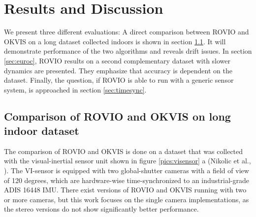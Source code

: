 \chapter{Results and Discussion}
\label{sec:results}

We present three different evaluations: A direct comparison between ROVIO and OKVIS on a long dataset collected indoors is shown in section \ref{sec:ijrr}. It will demonstrate performance of the two algorithms and reveals drift issues. In section \ref{sec:euroc}, ROVIO results on a second complementary dataset with slower dynamics are presented. They emphasize that accuracy is dependent on the dataset. Finally, the question, if ROVIO is able to run with a generic sensor system, is approached in section \ref{sec:timesync}.

\section{Comparison of ROVIO and OKVIS on long indoor dataset}
\label{sec:ijrr}

The comparison of ROVIO and OKVIS is done on a dataset that was collected with the visual-inertial sensor unit shown in figure \ref{pics:visensor} a (Nikolic et al., \cite{nikolic2014synchronized}). The VI-sensor is equipped with two global-shutter cameras with a field of view of 120 degrees, which are hardware-wise time-synchronized to an industrial-grade ADIS 16448 IMU. There exist versions of ROVIO and OKVIS running with two or more cameras, but this work focuses on the single camera implementations, as the stereo versions do not show significantly better performance.

